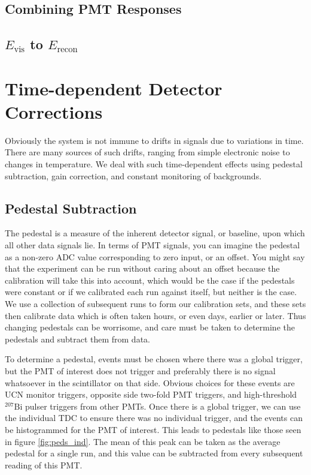 \subsection{Combining PMT Responses}

\subsection{$E_{\mathrm{vis}}$ to $E_{\mathrm{recon}}$}



\section{Time-dependent Detector Corrections}

Obviously the system is not immune to drifts in signals due to variations
in time. There are many sources of such drifts, ranging from simple
electronic noise to changes in temperature. We deal with such time-dependent
effects using pedestal subtraction, gain correction, and constant monitoring
of backgrounds.

\subsection{Pedestal Subtraction}
The pedestal is a measure of the inherent detector signal, or baseline, 
upon which all other data signals lie. In terms of PMT signals, you can imagine 
the pedestal as a non-zero ADC value corresponding to zero input, or an offset.
You might say that the experiment can be run without caring about an offset
because the calibration will take this into account, which would be the case 
if the pedestals were constant or if we calibrated each run against itself, but 
neither is the case. We use a collection of subsequent runs to form our 
calibration sets, and these sets then calibrate data which is often taken hours,
or even days, earlier or later. Thus changing pedestals can be worrisome, and care
must be taken to determine the pedestals and subtract them from data.

To determine a pedestal, events must be chosen where there was a global trigger, but
the PMT of interest does not trigger and preferably there is no signal
whatsoever in the scintillator on that side. Obvious choices for these events are
UCN monitor triggers, opposite side two-fold PMT triggers, and high-threshold $^{207}\mathrm{Bi}$
pulser triggers from other PMTs. Once there is a global trigger, we can use the individual TDC
to ensure there was no individual trigger, and the events can be 
histogrammed for the PMT of interest. This leads to pedestals like those seen in
figure \ref{fig:peds_ind}. The mean of this peak can be taken as the average pedestal for a single run,
and this value can be 
subtracted from every subsequent reading of this PMT.

